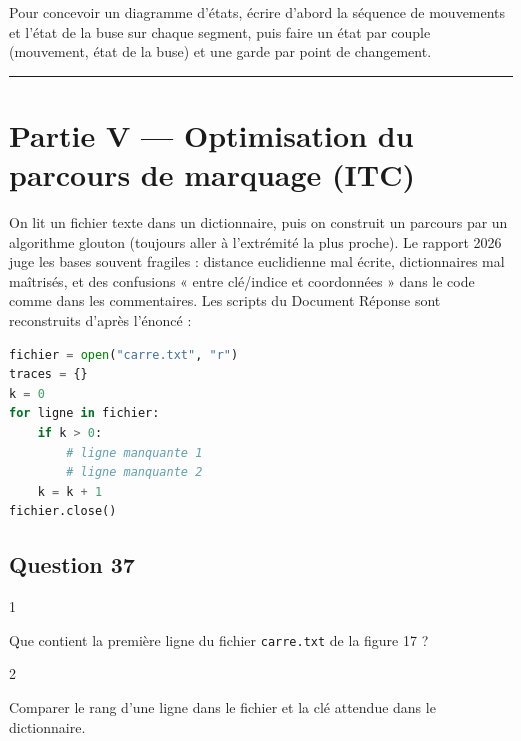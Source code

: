 \documentclass[11pt,a4paper]{article}
\begin{document}
\begin{methode}

Pour concevoir un diagramme d'états, écrire d'abord la séquence de mouvements et l'état de la buse sur chaque segment, puis faire un état par couple (mouvement, état de la buse) et une garde par point de changement.

\end{methode}

\begin{center}\rule{0.5\linewidth}{0.5pt}\end{center}

\hypertarget{partie-v-optimisation-du-parcours-de-marquage-itc}{%
\section{Partie V --- Optimisation du parcours de marquage (ITC)}\label{partie-v-optimisation-du-parcours-de-marquage-itc}}

On lit un fichier texte dans un dictionnaire, puis on construit un parcours par un algorithme glouton (toujours aller à l'extrémité la plus proche). Le rapport 2026 juge les bases souvent fragiles : distance euclidienne mal écrite, dictionnaires mal maîtrisés, et des confusions « entre clé/indice et coordonnées » dans le code comme dans les commentaires. Les scripts du Document Réponse sont reconstruits d'après l'énoncé :

\begin{lstlisting}[language=Python]
fichier = open("carre.txt", "r")
traces = {}
k = 0
for ligne in fichier:
    if k > 0:
        # ligne manquante 1
        # ligne manquante 2
    k = k + 1
fichier.close()
\end{lstlisting}

\hypertarget{question-37}{%
\subsection{Question 37}\label{question-37}}

\begin{indication}{1}

Que contient la première ligne du fichier \texttt{carre.txt} de la figure 17 ?

\end{indication}

\begin{indication}{2}

Comparer le rang d'une ligne dans le fichier et la clé attendue dans le dictionnaire.

\end{indication}
\end{document}
